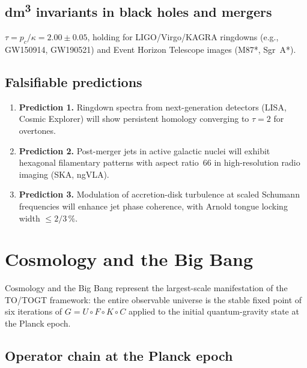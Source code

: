 \section{dm\textsuperscript{3} invariants in black holes and mergers}

$\tau = p_c / \kappa = 2.00 \pm 0.05$, holding for LIGO/Virgo/KAGRA ringdowns (e.g., GW150914, GW190521) and Event Horizon Telescope images (M87*, Sgr~A*).

\section{Falsifiable predictions}

\begin{enumerate}
\item \textbf{Prediction 1.} Ringdown spectra from next-generation detectors (LISA, Cosmic Explorer) will show persistent homology converging to \(\tau = 2\) for overtones.
\item \textbf{Prediction 2.} Post-merger jets in active galactic nuclei will exhibit hexagonal filamentary patterns with aspect ratio~66 in high-resolution radio imaging (SKA, ngVLA).
\item \textbf{Prediction 3.} Modulation of accretion-disk turbulence at scaled Schumann frequencies will enhance jet phase coherence, with Arnold tongue locking width $\le 2/3\,\%$.
\end{enumerate}

\bigskip

\chapter{Cosmology and the Big Bang}

Cosmology and the Big Bang represent the largest-scale manifestation of the TO/TOGT framework: the entire observable universe is the stable fixed point of six iterations of $G = U \circ F \circ K \circ C$ applied to the initial quantum-gravity state at the Planck epoch.

\section{Operator chain at the Planck epoch}

